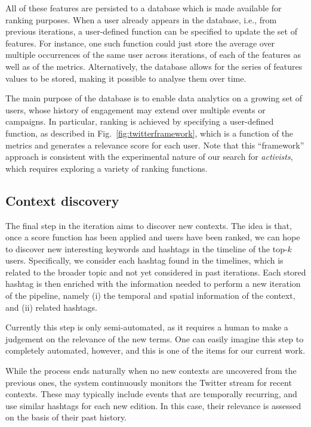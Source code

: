 \documentclass[runningheads]{llncs}
\begin{document}
All of these features are persisted to a database which is made available for ranking purposes.
When a user already appears in the database, i.e., from previous iterations, a user-defined function can be specified to update the set of features. 
For instance, one such function could just store the average over multiple occurrences of the same user across iterations, of each of the features as well as of the metrics.
Alternatively, the database allows for the series of features values to be stored, making it possible to analyse them over time.

The main purpose of the database is to enable data analytics on a growing set of users, whose history of engagement may extend over multiple events or campaigns.
In particular, ranking is achieved by specifying a user-defined function, as described in Fig.~\ref{fig:twitterframework}, which is a function of the metrics and generates a relevance score for each user.
Note that this ``framework'' approach is consistent with the experimental nature of our search for \textit{activists}, which requires exploring a variety of ranking functions.

\subsection{Context discovery} \label{sec:context-discovery}

The final step in the iteration aims to discover new contexts. 
The idea is that, once a score function has been applied and users have been ranked, we can hope to discover new interesting keywords and hashtags in the timeline of the top-$k$ users.
Specifically,  we consider each hashtag found in the timelines, which is related to the broader topic and not yet considered in past iterations.
Each stored hashtag is then enriched with the information needed to perform a new iteration of the pipeline, namely (i) the temporal and spatial information of the context, and (ii) related hashtags.

Currently this step is only semi-automated, as it requires a human to make a judgement on the relevance of the new terms. 
One can easily imagine this step to completely automated, however, and this is one of the items for our current work.

While the process ends naturally when no new contexts are uncovered from the previous ones, the system continuously monitors the Twitter stream for recent contexts. These may typically include events that are temporally recurring, and use similar hashtags for each new edition. In this case, their relevance is assessed on the basis of their past history.
\end{document}
